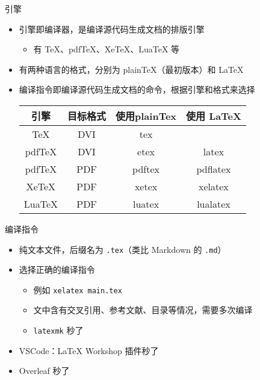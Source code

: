 \begin{frame}{引擎}
  \begin{itemize}
    \item 引擎即编译器，是编译源代码生成文档的排版引擎
      \begin{itemize}
        \item 有 TeX、pdfTeX、XeTeX、LuaTeX 等
      \end{itemize}
    \item 有两种语言的格式，分别为 plainTeX（最初版本）和 LaTeX
    \item 编译指令即编译源代码生成文档的命令，根据引擎和格式来选择
    \begin{table}[]
      \begin{tabular}{|c|c|c|c|}
      \hline
       引擎 & 目标格式 & 使用plainTex  & 使用 LaTeX  \\ \hline
       TeX & DVI & tex &  \\ \hline
       pdfTeX & DVI & etex &  latex \\ \hline
       pdfTeX & PDF & pdftex & 	pdflatex \\ \hline
       XeTeX & PDF & xetex & xelatex \\ \hline
       LuaTeX & PDF & luatex & lualatex \\ \hline
      \end{tabular}
    \end{table}
  \end{itemize}
\end{frame}

\begin{frame}{编译指令}
  \begin{itemize}
    \item 纯文本文件，后缀名为 \texttt{.tex}（类比 Markdown 的 \texttt{.md}）
    \pause
    \item 选择正确的编译指令
        \begin{itemize}
            \item 例如 \texttt{xelatex main.tex}
            \item 文中含有交叉引用、参考文献、目录等情况，需要多次编译
            \item \texttt{latexmk} 秒了
        \end{itemize}
    \pause
    \item VSCode：LaTeX Workshop 插件秒了
    \item Overleaf 秒了
  \end{itemize}
\end{frame}


